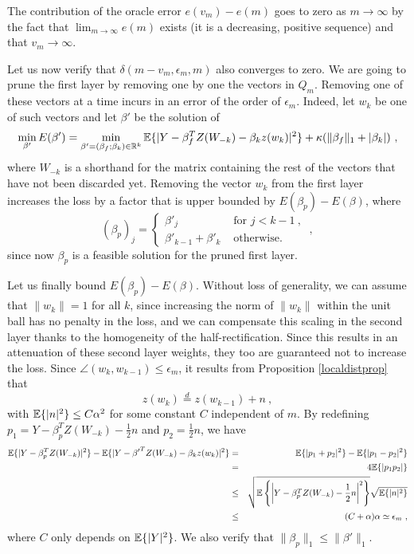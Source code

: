The contribution of the oracle error $e(v_m) - e(m)$ goes to zero as $m\to \infty$ by the 
fact that $\lim_{m \to \infty} e(m)$ exists (it is a decreasing, positive sequence) and that $v_m \to \infty$.

Let us now verify that $\delta(m - v_m, \epsilon_m, m)$ also converges to zero.
We are going to prune the first layer by removing one by one the vectors in $Q_m$.
Removing one of these vectors at a time incurs in an error of the order of $\epsilon_m$. 
Indeed, let $w_k$ be one of such vectors and let $\beta'$ be the solution of 
$$\min_{\beta'} E(\beta') = \min_{\beta'=(\beta_f;\beta_k) \in {\mathbb{R}}^{k}} {\mathbb{E}} \{ |Y - \beta_f^T Z(W_{-k}) - \beta_k z(w_k)|^2 \} + \kappa ( \| \beta_f \|_1 + |\beta_k| )~, $$
where $W_{-k}$ is a shorthand for the matrix containing the rest of the vectors that have not been discarded yet.
  Removing the vector $w_k$ from the first layer
 increases the loss by a factor that is upper bounded by $E(\beta_p) - E(\beta)$, where 
$$(\beta_p)_j = \left\{
\begin{array}{rl}
 \beta'_j  & \text{ for  } j < k -1 ~,\\
 \beta'_{k-1} + \beta'_{k } & \text{ otherwise.}
\end{array}\right.~, $$
 since now $\beta_p$ is a feasible solution for the pruned first layer.

Let us finally bound $E(\beta_p) - E(\beta)$. 
Without loss of generality, we can assume that $\| w_k \|=1$ for all $k$, since increasing the norm of $\|w_k\|$ 
within the unit ball has no penalty in the loss, and we can compensate this scaling in the second layer
thanks to the homogeneity of the half-rectification. Since this results in an attenuation of these second layer weights, 
they too are guaranteed not to increase the loss. 
Since $\angle(w_k,w_{k-1}) \leq \epsilon_m $, 
it results from Proposition \ref{localdistprop} that 
$$z(w_k) \stackrel{d}{=}  z(w_{k-1}) + n~,$$
with ${\mathbb{E}}\{|n|^2\} \leq C\alpha^2$ for some constant $C$ independent of $m$. 
By redefining $p_1 = Y - \beta_p^T Z(W_{-k}) - \frac{1}{2} n$ and 
$p_2 = \frac{1}{2}n$, we have 
\begin{eqnarray*}
{\mathbb{E}} \{ | Y - \beta_p^T Z(W_{-k}) |^2 \} - {\mathbb{E}} \{ | Y - {\beta'}^T Z(W_{-k}) - \beta_k z(w_k) |^2 \} & = & {\mathbb{E}}\{ | p_1 + p_2 |^2 \} - {\mathbb{E}} \{ |p_1 - p_2 |^2 \} \\
&=& 4{\mathbb{E}} \{ |p_1 p_2| \} \\
&\leq& \sqrt{ {\mathbb{E}}\left\{ \left|Y - \beta_p^T Z(W_{-k}) - \frac{1}{2} n \right|^2 \right\} } \sqrt{ {\mathbb{E}} \{ |n|^2 \} } \\
&\leq & (C+\alpha) \alpha \simeq \epsilon_m~,
\end{eqnarray*}
where $C$ only depends on ${\mathbb{E}}\{|Y|^2\}$. We also verify that $\| \beta_p\|_1 \leq \| \beta'\|_1$.

